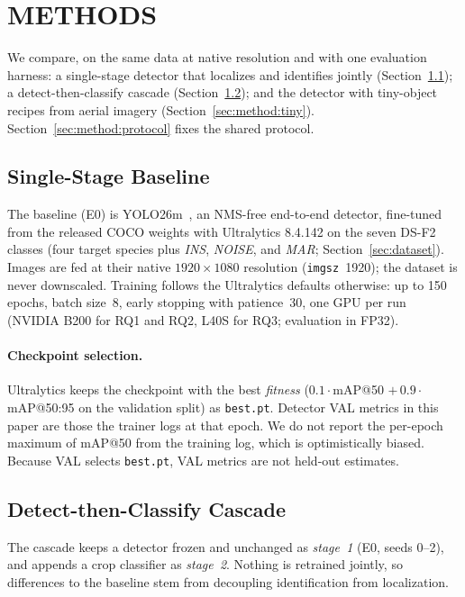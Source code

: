 \section{\uppercase{Methods}}
\label{sec:method}

We compare, on the same data at native resolution and with one evaluation harness: a single-stage detector that localizes and identifies jointly (Section~\ref{sec:method:single}); a detect-then-classify cascade (Section~\ref{sec:method:cascade}); and the detector with tiny-object recipes from aerial imagery (Section~\ref{sec:method:tiny}). Section~\ref{sec:method:protocol} fixes the shared protocol.

\subsection{Single-Stage Baseline}
\label{sec:method:single}

The baseline (E0) is YOLO26m~\cite{yolo26}, an NMS-free end-to-end detector, fine-tuned from the released COCO weights with Ultralytics 8.4.142 on the seven DS-F2 classes (four target species plus \emph{INS}, \emph{NOISE}, and \emph{MAR}; Section~\ref{sec:dataset}). Images are fed at their native $1920\times1080$ resolution (\texttt{imgsz}~1920); the dataset is never downscaled. Training follows the Ultralytics defaults otherwise: up to 150 epochs, batch size~8, early stopping with patience~30, one GPU per run (NVIDIA B200 for RQ1 and RQ2, L40S for RQ3; evaluation in FP32).

\paragraph{Checkpoint selection.}
Ultralytics keeps the checkpoint with the best \emph{fitness} ($0.1\cdot$mAP@50 $+\,0.9\cdot$mAP@50:95 on the validation split) as \texttt{best.pt}. Detector VAL metrics in this paper are those the trainer logs at that epoch. We do not report the per-epoch maximum of mAP@50 from the training log, which is optimistically biased. Because VAL selects \texttt{best.pt}, VAL metrics are not held-out estimates.

\subsection{Detect-then-Classify Cascade}
\label{sec:method:cascade}

The cascade keeps a detector frozen and unchanged as \emph{stage~1} (E0, seeds 0--2), and appends a crop classifier as \emph{stage~2}. Nothing is retrained jointly, so differences to the baseline stem from decoupling identification from localization.

